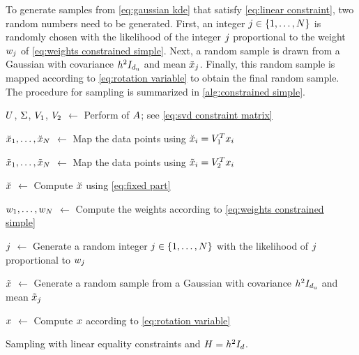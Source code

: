 To generate samples from \cref{eq:gaussian kde} that satisfy \cref{eq:linear constraint}, two random numbers need to be generated. 
First, an integer $j\in\{1,\ldots,N\}$ is randomly chosen with the likelihood of the integer $j$ proportional to the weight $w_{j}$ of \cref{eq:weights constrained simple}. 
Next, a random sample is drawn from a Gaussian with covariance $h^2 I_{d_\mathrm{u}}$ and mean $\tilde{x}_{j}$.
Finally, this random sample is mapped according to \cref{eq:rotation variable} to obtain the final random sample.
The procedure for sampling is summarized in \cref{alg:constrained simple}.

\begin{algorithm}[t]
	
	$U$, $\Sigma$, $V_1$, $V_2$ $\gets$ Perform  of $A$; see \cref{eq:svd constraint matrix}
	
	$\breve{x}_{1},\ldots,\breve{x}_{N}$ $\gets$ Map the data points using $\breve{x}_{i} = V_1^T x_{i}$
		
	$\tilde{x}_{1},\ldots,\tilde{x}_{N}$ $\gets$ Map the data points using $\tilde{x}_{i} = V_2^T x_{i}$
	
	$\breve{x}$ $\gets$ Compute $\breve{x}$ using \cref{eq:fixed part}
	
	$w_{1},\ldots,w_{N}$ $\gets$ Compute the weights according to \cref{eq:weights constrained simple}
	
	$j$ $\gets$ Generate a random integer $j\in\{1,\ldots,N\}$ with the likelihood of $j$ proportional to $w_{j}$
	
	$\tilde{x}$ $\gets$ Generate a random sample from a Gaussian with covariance $h^2 I_{d_\mathrm{u}}$ and mean $\tilde{x}_{j}$
	
	$x$ $\gets$ Compute $x$ according to \cref{eq:rotation variable}
		
	\caption{Sampling with linear equality constraints and $H=h^2 I_{d}$.}
	\label{alg:constrained simple}
\end{algorithm}



